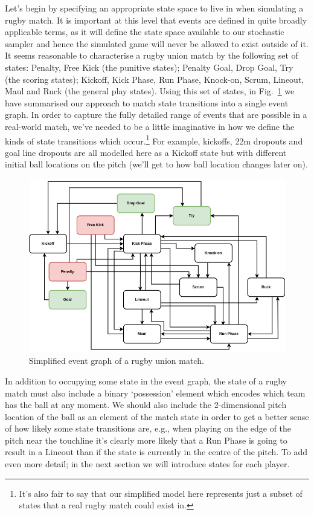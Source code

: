 Let's begin by specifying an appropriate state space to live in when simulating a rugby match. It is important at this level that events are defined in quite broadly applicable terms, as it will define the state space available to our stochastic sampler and hence the simulated game will never be allowed to exist outside of it. It seems reasonable to characterise a rugby union match by the following set of states: {\sf Penalty}, {\sf Free Kick} (the punitive states); {\sf Penalty Goal}, {\sf Drop Goal}, {\sf Try} (the scoring states); {\sf Kickoff}, {\sf Kick Phase}, {\sf Run Phase}, {\sf Knock-on}, {\sf Scrum}, {\sf Lineout}, {\sf Maul} and {\sf Ruck} (the general play states). Using this set of states, in Fig.~\ref{fig:event-graph} we have summarised our approach to match state transitions into a single event graph. In order to capture the fully detailed range of events that are possible in a real-world match, we've needed to be a little imaginative in how we define the kinds of state transitions which occur.\footnote{It's also fair to say that our simplified model here represents just a subset of states that a real rugby match could exist in.} For example, kickoffs, 22m dropouts and goal line dropouts are all modelled here as a {\sf Kickoff} state but with different initial ball locations on the pitch (we'll get to how ball location changes later on).

\begin{figure}[h]
\includegraphics[width=14cm]{images/trywizard-event-graph.drawio.png}
\caption{Simplified event graph of a rugby union match.}
\label{fig:event-graph}
\end{figure}

In addition to occupying some state in the event graph, the state of a rugby match must also include a binary `possession' element which encodes which team has the ball at any moment. We should also include the 2-dimensional pitch location of the ball as an element of the match state in order to get a better sense of how likely some state transitions are, e.g., when playing on the edge of the pitch near the touchline it's clearly more likely that a {\sf Run Phase} is going to result in a {\sf Lineout} than if the state is currently in the centre of the pitch. To add even more detail; in the next section we will introduce states for each player.

